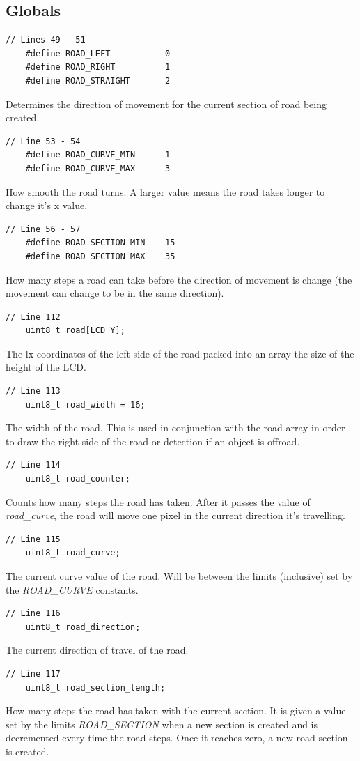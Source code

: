 \documentclass{article}
\begin{document}
\subsection*{Globals}
\begin{lstlisting}[style=CStyle]
	// Lines 49 - 51
	#define ROAD_LEFT           0
	#define ROAD_RIGHT          1
	#define ROAD_STRAIGHT       2
\end{lstlisting}
Determines the direction of movement for the current section of road being created.
\begin{lstlisting}[style=CStyle]
	// Line 53 - 54
	#define ROAD_CURVE_MIN      1
	#define ROAD_CURVE_MAX      3
\end{lstlisting}
How smooth the road turns. A larger value means the road takes longer to change it's x value. 
\begin{lstlisting}[style=CStyle]
	// Line 56 - 57
	#define ROAD_SECTION_MIN    15
	#define ROAD_SECTION_MAX    35
\end{lstlisting}
How many steps a road can take before the direction of movement is change (the movement can change to be in the same direction). 
\begin{lstlisting}[style=CStyle]
	// Line 112
	uint8_t road[LCD_Y]; 
\end{lstlisting}
The lx coordinates of the left side of the road packed into an array the size of the height of the LCD. 
\begin{lstlisting}[style=CStyle]
	// Line 113
	uint8_t road_width = 16; 
\end{lstlisting}
The width of the road. This is used in conjunction with the road array in order to draw the right side of the road or detection if an object is offroad.
\begin{lstlisting}[style=CStyle]
	// Line 114
	uint8_t road_counter;
\end{lstlisting}
Counts how many steps the road has taken. After it passes the value of \emph{road\_curve}, the road will move one pixel in the current direction it's travelling.
\begin{lstlisting}[style=CStyle]
	// Line 115
	uint8_t road_curve;
\end{lstlisting}
The current curve value of the road. Will be between the limits (inclusive) set by the \emph{ROAD\_CURVE} constants.
\begin{lstlisting}[style=CStyle]
	// Line 116
	uint8_t road_direction;
\end{lstlisting}
The current direction of travel of the road.
\begin{lstlisting}[style=CStyle]
	// Line 117
	uint8_t road_section_length;
\end{lstlisting}
How many steps the road has taken with the current section. It is given a value set by the limits \emph{ROAD\_SECTION} when a new section is created and is decremented every time the road steps. Once it reaches zero, a new road section is created. 
\newpage
\end{document}
